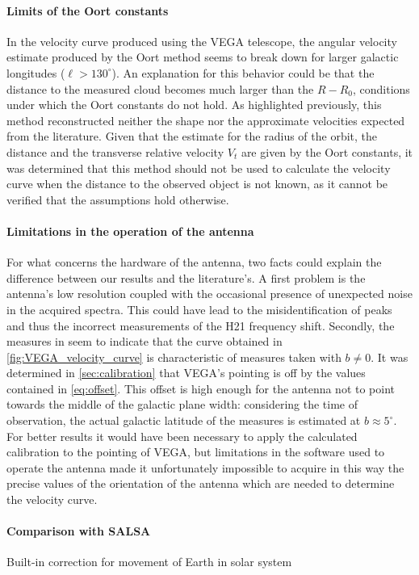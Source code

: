 \paragraph{Limits of the Oort constants}
In the velocity curve produced using the VEGA telescope, the angular velocity estimate produced by the Oort method seems to break down for larger galactic longitudes ($\ell > 130^\circ$). An explanation for this behavior could be that the distance to the measured cloud becomes much larger than the $R-R_0$, conditions under which the Oort constants do not hold.
As highlighted previously, this method reconstructed neither the shape nor the approximate velocities expected from the literature.
Given that the estimate for the radius of the orbit, the distance and the transverse relative velocity $V_t$ are given by the Oort constants, it was determined that this method should not be used to calculate the velocity curve when the distance to the observed object is not known, as it cannot be verified that the assumptions hold otherwise.

\paragraph{Limitations in the operation of the antenna}
For what concerns the hardware of the antenna, two facts could explain the difference between our results and the literature's. 
A first problem is the antenna's low resolution coupled with the occasional presence of unexpected noise in the acquired spectra. This could have lead to the misidentification of peaks and thus the incorrect measurements of the H21 frequency shift. 
Secondly, the measures in \cite{sakhawat_hossain_salsa_2018} seem to indicate that the curve obtained in \autoref{fig:VEGA_velocity_curve} is characteristic of measures taken with $b \neq 0$. 
It was determined in \autoref{sec:calibration} that VEGA's pointing is off by the values contained in \autoref{eq:offset}.
This offset is high enough for the antenna not to point towards the middle of the galactic plane width: considering the time of observation, the actual galactic latitude of the measures is estimated at $b \approx 5^{\circ}$.
For better results it would have been necessary to apply the calculated calibration to the pointing of VEGA, but limitations in the software used to operate the antenna made it unfortunately impossible to acquire in this way the precise values of the orientation of the antenna which are needed to determine the velocity curve.


\paragraph{Comparison with SALSA}
Built-in correction for movement of Earth in solar system



